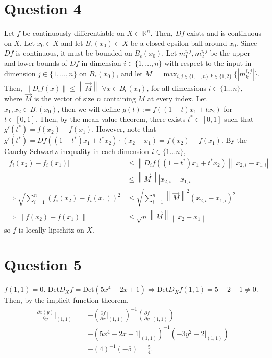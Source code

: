 \documentclass[11pt]{article} %
\newcommand{\norm}[1]{\left\lVert#1\right\rVert}
\begin{document}
\section{Question 4}
Let $f$ be continuously differentiable on $X \subset \mathbb{R}^n$. Then, $Df$ exists and is continuous on $ X.$ Let $x_0 \in X$ and let $B_{\epsilon}(x_0) \subset X$ be a closed epsilon ball around $x_0$. Since $Df$ is continuous, it must be bounded on $B_{\epsilon}(x_0)$. Let $m_1^{i,j},m_2^{i,j}$ be the upper and lower bounds of $Df$ in dimension $i \in \{ 1,\dots,n\}$ with respect to the input in dimension $j \in \{ 1,\dots,n\}$ on $B_{\epsilon}(x_0)$, and let $M = \max_{i,j \in \{1,\dots,n \}, k \in \{ 1,2\} }\{|m_k^{i,j}|\}$. Then, $\norm{D_if(x)}\leq \norm{\vec{M}}$ $\forall x \in B_{\epsilon}(x_0)$, for all dimensions $i \in \{ 1 \dots n\}$, where $\vec{M}$ is the vector of size $n $ containing $M$ at every index. Let $x_1,x_2 \in B_{\epsilon}(x_0)$, then we will define $g(t):= f((1-t)x_1 + tx_2)$ for $t \in [0,1].$ Then, by the mean value theorem, there exists $t^{*} \in [0,1]$ such that $g'(t^{*})  = f(x_2) - f(x_1).$ However, note that $g'(t^{*}) = Df((1-t^{*})x_1 + t^{*}x_2)\cdot (x_2 - x_1) = f(x_2) - f(x_1)$. By the Cauchy-Schwartz inequality in each dimension $i \in \{ 1 \dots n\}$, 
\begin{align*}
|f_i(x_2) - f_i(x_1)|&\leq \norm{D_if((1-t^{*})x_1 + t^{*}x_2)}|x_{2,i} - x_{1,i}|\\ 
&\leq \norm{\vec{M}}|x_{2,i}-x_{1,i}|\\
\Rightarrow \sqrt{\sum_{i=1}^n (f_i(x_2) - f_i(x_1))^2} &\leq \sqrt{\sum_{i=1}^n \norm{\vec{M}}^2(x_{2,i} - x_{1,i})^2 } \\
\Rightarrow \norm{f(x_2) - f(x_1)} &\leq \sqrt{n}\norm{\vec{M}}\norm{x_{2}-x_{1}} 
\end{align*}
 so $f$ is locally lipschitz on $X$.
\section{Question 5}
$f(1,1) = 0.$ Det$D_Xf = \text{Det} (5x^4 - 2x +1) \Rightarrow \text{Det}D_Xf(1,1) = 5 - 2+1 \neq 0.$ Then, by the implicit function theorem,
\begin{align*}
\frac{\partial x(y)}{\partial y}|_{(1,1)} &= - \left(\frac{\partial f}{\partial x}|_{(1,1)}\right)^{-1}\left(\frac{\partial f}{\partial y}|_{(1,1)}\right) \\
&= - (5x^4 - 2x + 1 |_{(1,1)})^{-1}(-3y^2 - 2|_{(1,1)})\\
&= - (4)^{-1}(-5) = \frac{5}{4}.
\end{align*}
\end{document}
